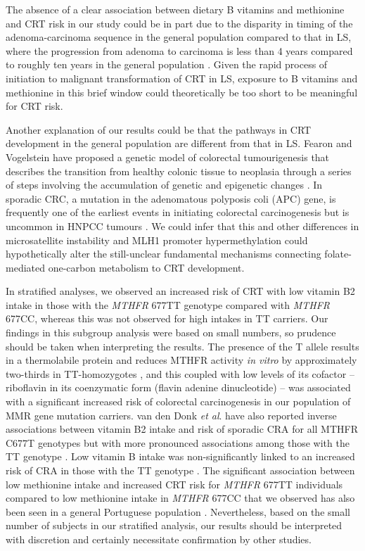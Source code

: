 \noindent The absence of a clear association between dietary B vitamins and methionine and CRT risk in our study could be in part due to the disparity in timing of the adenoma-carcinoma sequence in the general population compared to that in LS, where the progression from adenoma to carcinoma is less than 4 years \cite{c610,c644} compared to roughly ten years in the general population \cite{c645}. Given the rapid process of initiation to malignant transformation of CRT in LS, exposure to B vitamins and methionine in this brief window could theoretically be too short to be meaningful for CRT risk.

\noindent Another explanation of our results could be that the pathways in CRT development in the general population are different from that in LS. Fearon and Vogelstein have proposed a genetic model of colorectal tumourigenesis that describes the transition from healthy colonic tissue to neoplasia through a series of steps involving the accumulation of genetic and epigenetic changes \cite{c68}. In sporadic CRC, a mutation in the adenomatous polyposis coli (APC) gene, is frequently one of the earliest events in initiating colorectal carcinogenesis \cite{c646} but is uncommon in HNPCC tumours \cite{c647}. We could infer that this and other differences in microsatellite instability and MLH1 promoter hypermethylation could hypothetically alter the still-unclear fundamental mechanisms connecting folate-mediated one-carbon metabolism to CRT development.

\noindent In stratified analyses, we observed an increased risk of CRT with low vitamin B2 intake in those with the \emph{MTHFR} 677TT genotype compared with \emph{MTHFR} 677CC, whereas this was not observed for high intakes in TT carriers. Our findings in this subgroup analysis were based on small numbers, so prudence should be taken when interpreting the results. The presence of the T allele results in a thermolabile protein and reduces MTHFR activity \emph{in vitro} by approximately two-thirds in TT-homozygotes \cite{c648}, and this coupled with low levels of its cofactor -- riboflavin in its coenzymatic form (flavin adenine dinucleotide) -- was associated with a significant increased risk of colorectal carcinogenesis in our population of MMR gene mutation carriers. van den Donk \emph{et al}. have also reported inverse associations between vitamin B2 intake and risk of sporadic CRA for all MTHFR C677T genotypes but with more pronounced associations among those with the TT genotype \cite{c621}. Low vitamin B intake was non-significantly linked to an increased risk of CRA in those with the TT genotype \cite{c621}. The significant association between low methionine intake and increased CRT risk for \emph{MTHFR} 677TT individuals compared to low methionine intake in \emph{MTHFR} 677CC that we observed has also been seen in a general Portuguese population \cite{c649}. Nevertheless, based on the small number of subjects in our stratified analysis, our results should be interpreted with discretion and certainly necessitate confirmation by other studies.

